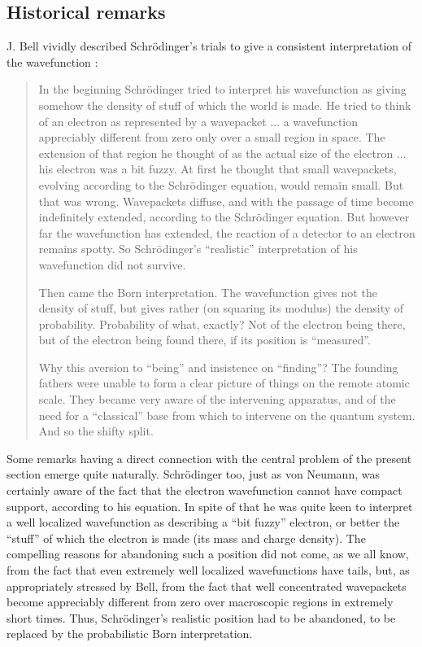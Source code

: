 \documentclass[12pt]{article}
\begin{document}
\subsection{Historical remarks} \label{sec131}

J. Bell vividly described Schr\"odinger's trials to give a
consistent interpretation of the wavefunction \cite{bellam}:

\begin{quotation}
In the beginning Schr\"{o}dinger tried to interpret his
wavefunction as giving somehow the density of stuff of which the
world is made. He tried to think of an electron as represented by
a wavepacket ... a wavefunction appreciably different from zero
only over a small region in space. The extension of that region he
thought of as the actual size of the electron ... his electron was
a bit fuzzy. At first he thought that small wavepackets, evolving
according to the Schr\"{o}dinger equation, would remain small. But
that was wrong. Wavepackets diffuse, and with the passage of time
become indefinitely extended, according to the Schr\"{o}dinger
equation. But however far the wavefunction has extended, the
reaction of a detector to an electron remains spotty. So
Schr\"{o}dinger's ``realistic'' interpretation of his wavefunction
did not survive.

Then came the Born interpretation. The wavefunction gives not the
density of stuff, but gives rather (on squaring its modulus) the
density of probability. Probability of what, exactly? Not of the
electron being there, but of the electron being found there, if
its position is ``measured''.

Why this aversion to ``being'' and insistence on ``finding''? The
founding fathers were unable to form a clear picture of things on
the remote atomic scale. They became very aware of the intervening
apparatus, and of the need for a ``classical'' base from which to
intervene on the quantum system. And so the shifty split.
\end{quotation}

Some remarks having a direct connection with the central problem
of the present section emerge quite naturally. Schr\"{o}dinger
too, just as von Neumann, was certainly aware of the fact that the
electron wavefunction cannot have compact support, according to
his equation. In spite of that he was quite keen to interpret a
well localized wavefunction as describing a ``bit fuzzy''
electron, or better the ``stuff'' of which the electron is made
(its mass and charge density). The compelling reasons for
abandoning such a position did not come, as we all know, from the
fact that even extremely well localized wavefunctions have tails,
but, as appropriately stressed by Bell, from the fact that well
concentrated wavepackets become appreciably different from zero
over macroscopic regions in extremely short times. Thus,
Schr\"{o}dinger's realistic position had to be abandoned, to be
replaced by the probabilistic Born interpretation.
\end{document}
